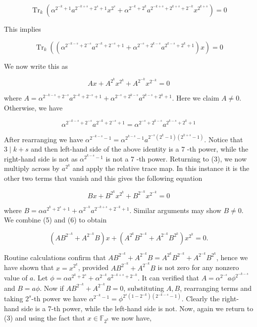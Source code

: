 \documentclass[10pt]{article}
\begin{document}
$$
\operatorname{Tr}_{k}\left(\alpha^{2^{-k}+1} a^{2^{-k+s}+2^{s}+1} x^{2^{s}}+\alpha^{2^{-k}+2^{k}} a^{2^{-k+s}+2^{k+s}+2^{-k}} x^{2^{k+s}}\right)=0
$$

This implies

$$
\operatorname{Tr}_{k}\left(\left(\alpha^{2^{-k-s}+2^{-s}} a^{2^{-k}+2^{-s}+1}+\alpha^{2^{-s}+2^{k-s}} a^{2^{k-s}+2^{k}+1}\right) x\right)=0
$$

We now write this as


\begin{equation*}
A x+A^{2^{k}} x^{2^{k}}+A^{2^{-k}} x^{2^{-k}}=0 \tag{5}
\end{equation*}


where $A=\alpha^{2^{-k-s}+2^{-s}} a^{2^{-k}+2^{-s}+1}+\alpha^{2^{-s}+2^{k-s}} a^{2^{k-s}+2^{k}+1}$. Here we claim $A \neq 0$. Otherwise, we have

$$
\alpha^{2^{-k-s}+2^{-s}} a^{2^{-k}+2^{-s}+1}=\alpha^{2^{-s}+2^{k-s}} a^{2^{k-s}+2^{k}+1}
$$

After rearranging we have $\alpha^{2^{-k-s}-1}=\alpha^{2^{k-s}-1} a^{2^{-s}\left(2^{k}-1\right)\left(2^{k+s}-1\right)}$. Notice that $3 \mid k+s$ and then left-hand side of the above identity is a 7 -th power, while the right-hand side is not as $\alpha^{2^{k-s}-1}$ is not a 7 -th power. Returning to (3), we now multiply across by $a^{2^{k}}$ and apply the relative trace map. In this instance it is the other two terms that vanish and this gives the following equation


\begin{equation*}
B x+B^{2^{k}} x^{2^{k}}+B^{2^{-k}} x^{2^{-k}}=0 \tag{6}
\end{equation*}


where $B=\alpha a^{2^{k}+2^{s}+1}+\alpha^{2^{-k}} a^{2^{-k+s}+2^{-k}+1}$. Similar arguments may show $B \neq 0$. We combine (5) and (6) to obtain

$$
\left(A B^{2^{-k}}+A^{2^{-k}} B\right) x+\left(A^{2^{k}} B^{2^{-k}}+A^{2^{-k}} B^{2^{k}}\right) x^{2^{k}}=0 .
$$

Routine calculations confirm that $A B^{2^{-k}}+A^{2^{-k}} B=A^{2^{k}} B^{2^{-k}}+A^{2^{-k}} B^{2^{k}}$, hence we have shown that $x=x^{2^{k}}$, provided $A B^{2^{-k}}+A^{2^{-k}} B$ is not zero for any nonzero value of $a$. Let $\phi=\alpha a^{2^{k}+2^{s}}+ \alpha^{2^{-k}} a^{2^{-k+s}+2^{-k}}$. It can verified that $A=\alpha^{2^{-s}} a \phi^{2^{-k-s}}$ and $B=a \phi$. Now if $A B^{2^{-k}}+A^{2^{-k}} B=0$, substituting $A, B$, rearranging terms and taking $2^{s}$-th power we have $\alpha^{2^{-k}-1}=\phi^{2^{s}\left(1-2^{-k}\right)\left(2^{-k-s}-1\right)}$. Clearly the right-hand side is a 7-th power, while the left-hand side is not. Now, again we return to (3) and using the fact that $x \in \mathbb{F}_{2^{k}}$ we now have,
\end{document}

